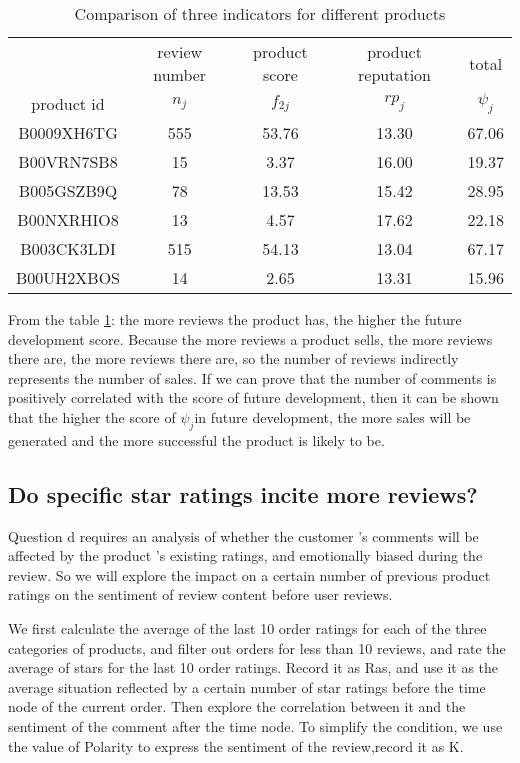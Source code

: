 \documentclass{mcmthesis}
\begin{document}
\begin{table}[h]	
	\caption{Comparison of three indicators for different products}\label{biao4q1}
	\centering
	\begin{tabular}{ccccc}
		& & & & \\
		\toprule &review number & product score  & product reputation  & total  \\
		product id &$n_j$ & $f_{2j}$ & $rp_{j}$ & $\psi_j$ \\
		\midrule B0009XH6TG & 555 & 53.76 & 13.30 & 67.06 \\
		B00VRN7SB8 & 15 & 3.37 & 16.00 & 19.37 \\
		B005GSZB9Q & 78 & 13.53 & 15.42 & 28.95 \\
		B00NXRHIO8 & 13 & 4.57 & 17.62 & 22.18 \\
		B003CK3LDI & 515 & 54.13 & 13.04 & 67.17 \\
		B00UH2XBOS & 14 & 2.65 & 13.31 & 15.96 \\
		\bottomrule
	\end{tabular}
\end{table}
\newpage
From the table \ref{biao4q1}: the more reviews the product has, the higher the future development score. Because the more reviews a product sells, the more reviews there are, the more reviews there are, so the number of reviews indirectly represents the number of sales. If we can prove that the number of comments is positively correlated with the score of future development, then it can be shown that the higher the score of $\psi_j$in future development, the more sales will be generated and the more successful the product is likely to be.

\subsection{Do specific star ratings incite more reviews?}

Question d requires an analysis of whether the customer ’s comments will be affected by the product ’s existing ratings, and emotionally biased during the review. So we will explore the impact on a certain number of previous product ratings on the sentiment of review content before user reviews.

We first calculate the average of the last 10 order ratings for each of the three categories of products, and filter out orders for less than 10 reviews, and rate the average of stars for the last 10 order ratings. Record it as Ras, and use it as the average situation reflected by a certain number of star ratings before the time node of the current order. Then explore the correlation between it and the sentiment of the comment after the time node. To simplify the condition, we use the value of Polarity to express the sentiment of the review,record it as K.
\end{document}
